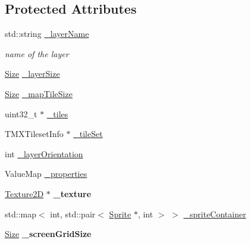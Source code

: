 \subsection*{Protected Attributes}
\begin{DoxyCompactItemize}
\item 
\mbox{\label{classexperimental_1_1TMXLayer_a9b8057f8917717f2147a9ec4fc63445b}} 
std\+::string \hyperlink{classexperimental_1_1TMXLayer_a9b8057f8917717f2147a9ec4fc63445b}{\+\_\+layer\+Name}
\begin{DoxyCompactList}\small\item\em name of the layer \end{DoxyCompactList}\item 
\hyperlink{classSize}{Size} \hyperlink{classexperimental_1_1TMXLayer_a994e928975bb81ce6a5f05170149a9eb}{\+\_\+layer\+Size}
\item 
\hyperlink{classSize}{Size} \hyperlink{classexperimental_1_1TMXLayer_a307d65856e767871ec81f9c456a2401e}{\+\_\+map\+Tile\+Size}
\item 
uint32\+\_\+t $\ast$ \hyperlink{classexperimental_1_1TMXLayer_a61e9c6961caaa162e77168cc7166d8de}{\+\_\+tiles}
\item 
T\+M\+X\+Tileset\+Info $\ast$ \hyperlink{classexperimental_1_1TMXLayer_a19b5b98c2f7a6018e66752b0df696cec}{\+\_\+tile\+Set}
\item 
int \hyperlink{classexperimental_1_1TMXLayer_af42f7e450205e2758911253875a999d3}{\+\_\+layer\+Orientation}
\item 
Value\+Map \hyperlink{classexperimental_1_1TMXLayer_a8275cd1a7a60db259c4e54801acd8381}{\+\_\+properties}
\item 
\mbox{\label{classexperimental_1_1TMXLayer_a776871ef8ea5987c0412f49995790510}} 
\hyperlink{classTexture2D}{Texture2D} $\ast$ {\bfseries \+\_\+texture}
\item 
std\+::map$<$ int, std\+::pair$<$ \hyperlink{classSprite}{Sprite} $\ast$, int $>$ $>$ \hyperlink{classexperimental_1_1TMXLayer_a7b00606f2522178e9f20197a363612f7}{\+\_\+sprite\+Container}
\item 
\mbox{\label{classexperimental_1_1TMXLayer_a77698933415547345b035844a4bae48c}} 
\hyperlink{classSize}{Size} {\bfseries \+\_\+screen\+Grid\+Size}
\item 
\mbox{\label{classexperimental_1_1TMXLayer_a6fa2115c4e39042d698f7f76a623f0f6}} 

\end{DoxyCompactItemize}
